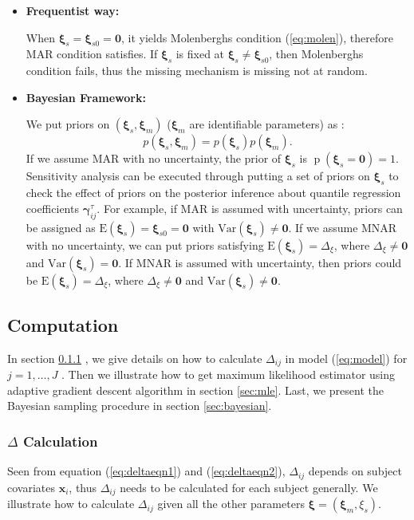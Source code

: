 \documentclass[12pt]{article}
\DeclareMathOperator{\pr}{p}
\begin{document}
\begin{itemize}
\item \textbf{Frequentist way: }

  When $\bm \xi_s = \bm \xi_{s0} = \bm 0$, it yields Molenberghs
  condition (\ref{eq:molen}), therefore MAR condition satisfies. If
  $\bm \xi_s$ is fixed at $\bm \xi_s \neq \bm \xi_{s0}$, then
  Molenberghs condition fails, thus the missing mechanism is missing
  not at random.
\item \textbf{Bayesian Framework: }

  We put priors on $(\bm \xi_s, \bm \xi_m)$ ($\bm \xi_m$ are
  identifiable parameters) as :
  \begin{displaymath}
    p(\bm \xi_s, \bm \xi_m) = p(\bm \xi_s) p(\bm \xi_m).
  \end{displaymath} 
  If we assume MAR with no uncertainty, the prior of $\bm \xi_s$ is
  $\pr(\bm \xi_s = \bm 0) = 1$. Sensitivity analysis can be executed
  through putting a set of priors on $\bm \xi_s$ to check the effect
  of priors on the posterior inference about quantile regression
  coefficients $\bm \gamma_{ij}^{\tau}$. For example, if MAR is
  assumed with uncertainty, priors can be assigned as $\textrm{E}(\bm
  \xi_s) = \bm \xi_{s0} = \bm 0$ with $\textrm{Var}(\bm \xi_s) \neq
  \bm 0$. If we assume MNAR with no uncertainty, we can put priors
  satisfying $\textrm{E}(\bm \xi_s) = \Delta_{\xi}$, where
  $\Delta_{\xi} \neq \bm 0$ and $\textrm{Var}(\bm \xi_s) = \bm 0$. If
  MNAR is assumed with uncertainty, then priors could be
  $\textrm{E}(\bm \xi_s) = \Delta_{\xi}$, where $\Delta_{\xi} \neq \bm
  0 $ and $\textrm{Var}(\bm \xi_s) \neq \bm 0$.
\end{itemize}

\subsection{Computation}
\label{sec:computation}

In section \ref{sec:deltacal} , we give details on how to calculate
$\Delta_{ij}$ in model (\ref{eq:model}) for $j = 1, \ldots, J$ . Then
we illustrate how to get maximum likelihood estimator using adaptive
gradient descent algorithm in section \ref{sec:mle}. Last, we present
the Bayesian sampling procedure in section \ref{sec:bayesian}.

\subsubsection{$\Delta$ Calculation}
\label{sec:deltacal}
Seen from equation (\ref{eq:deltaeqn1}) and (\ref{eq:deltaeqn2}),
$\Delta_{ij}$ depends on subject covariates $\bm x_i$, thus
$\Delta_{ij}$ needs to be calculated for each subject generally. We
illustrate how to calculate $\Delta_{ij}$ given all the other
parameters $\bm \xi = (\bm \xi_m, \xi_s)$.
\end{document}
